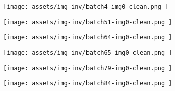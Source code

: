 \begin{figure*}[t]
\centering
\footnotesize
    \begin{minipage}[t]{.025\textwidth}
         \vspace{11mm}
    \end{minipage}%
    \begin{minipage}[t]{.98\textwidth}
        \vspace{0pt}
            \begin{subfigure}[t]{0.16\textwidth}
                    \texttt{[image:  assets/img-inv/batch4-img0-clean.png ]}
            \end{subfigure}%
                \hspace{0.5mm}%
            \begin{subfigure}[t]{0.16\textwidth}
                    \texttt{[image:  assets/img-inv/batch51-img0-clean.png ]}
            \end{subfigure}%
                \hspace{0.5mm}%
            \begin{subfigure}[t]{0.16\textwidth}
                    \texttt{[image:  assets/img-inv/batch64-img0-clean.png ]}
            \end{subfigure}%
                \hspace{0.5mm}%
            \begin{subfigure}[t]{0.16\textwidth}
                    \texttt{[image:  assets/img-inv/batch65-img0-clean.png ]}
            \end{subfigure}%
                \hspace{0.5mm}%
            \begin{subfigure}[t]{0.16\textwidth}
                    \texttt{[image:  assets/img-inv/batch79-img0-clean.png ]}
            \end{subfigure}%
                \hspace{0.5mm}%
            \begin{subfigure}[t]{0.16\textwidth}
                    \texttt{[image:  assets/img-inv/batch84-img0-clean.png ]}
            \end{subfigure}%
    \end{minipage}


\end{figure*}
